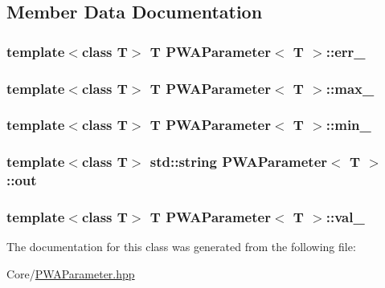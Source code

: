\subsection{Member Data Documentation}
\hypertarget{classPWAParameter_acea642e8ce9666a54bcecffc573acbde}{
\subsubsection[{err\_\-}]{\setlength{\rightskip}{0pt plus 5cm}template$<$class T$>$ T {\bf PWAParameter}$<$ T $>$::{\bf err\_\-}}}
\label{d2/d41/classPWAParameter_acea642e8ce9666a54bcecffc573acbde}
\hypertarget{classPWAParameter_a6baf4acd771fc311860d1f8c5ff01026}{
\subsubsection[{max\_\-}]{\setlength{\rightskip}{0pt plus 5cm}template$<$class T$>$ T {\bf PWAParameter}$<$ T $>$::{\bf max\_\-}}}
\label{d2/d41/classPWAParameter_a6baf4acd771fc311860d1f8c5ff01026}
\hypertarget{classPWAParameter_aafd4f577aa33a901f7ed8e7544158af0}{
\subsubsection[{min\_\-}]{\setlength{\rightskip}{0pt plus 5cm}template$<$class T$>$ T {\bf PWAParameter}$<$ T $>$::{\bf min\_\-}}}
\label{d2/d41/classPWAParameter_aafd4f577aa33a901f7ed8e7544158af0}
\hypertarget{classPWAParameter_aa2b305c00ce772a886f23cabe1170a08}{
\subsubsection[{out}]{\setlength{\rightskip}{0pt plus 5cm}template$<$class T$>$ std::string {\bf PWAParameter}$<$ T $>$::{\bf out}}}
\label{d2/d41/classPWAParameter_aa2b305c00ce772a886f23cabe1170a08}
\hypertarget{classPWAParameter_a340ff1428a7859762b83ee9f607b45b5}{
\subsubsection[{val\_\-}]{\setlength{\rightskip}{0pt plus 5cm}template$<$class T$>$ T {\bf PWAParameter}$<$ T $>$::{\bf val\_\-}}}
\label{d2/d41/classPWAParameter_a340ff1428a7859762b83ee9f607b45b5}


The documentation for this class was generated from the following file:\begin{DoxyCompactItemize}
\item 
Core/\hyperlink{PWAParameter_8hpp}{PWAParameter.hpp}\end{DoxyCompactItemize}
